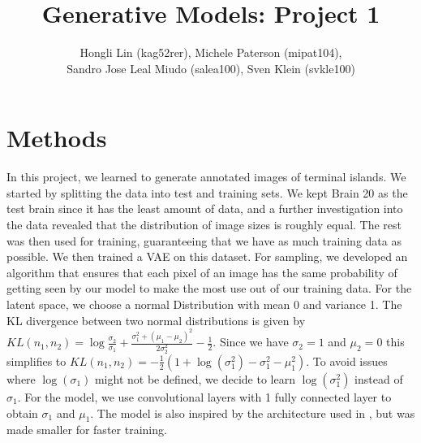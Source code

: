 \documentclass[12pt]{article}
\begin{document}
 
%
%
 
\title{Generative Models: Project 1} %
\author{Hongli Lin (kag52rer), Michele Paterson (mipat104),\\ Sandro Jose Leal Miudo (salea100), Sven Klein (svkle100)} %
\maketitle
\section{Methods}
In this project, we learned to generate annotated images of terminal islands. We started by splitting the data into test and training sets. We kept Brain 20 as the test brain since it has the least amount of data, and a further investigation into the data revealed that the distribution of image sizes is roughly equal. The rest was then used for training, guaranteeing that we have as much training data as possible. We then trained a VAE on this dataset. For sampling, we developed an algorithm that ensures that each pixel of an image has the same probability of getting seen by our model to make the most use out of our training data. For the latent space, we choose a normal Distribution with mean 0 and variance 1. The KL divergence between two normal distributions is given by $KL(n_1, n_2) = \log\frac{\sigma_2}{\sigma_1} + \frac{\sigma_1^2 + (\mu_1 - \mu_2)^2}{2 \sigma_2^2} - \frac{1}{2}$. Since we have $\sigma_2 = 1$ and $\mu_2 = 0$ this simplifies to $KL(n_1, n_2) = -\frac{1}{2} (1 + \log(\sigma_1^2) - \sigma_1^2 - \mu_1^2)$. To avoid issues where $\log(\sigma_1)$ might not be defined, we decide to learn $\log(\sigma_1^2)$ instead of $\sigma_1$. For the model, we use convolutional layers with 1 fully connected layer to obtain $\sigma_1$ and $\mu_1$. The model is also inspired by the architecture used in \cite{higgins2017betavae}, but was made smaller for faster training.\\
\end{document}
